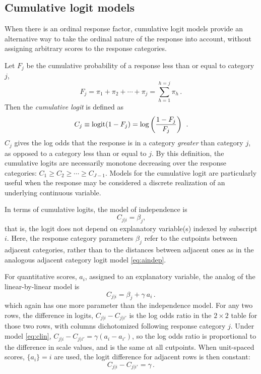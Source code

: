 

\subsection{Cumulative logit models}\label{sec:loglin-ordcum}
When there is an ordinal response factor, cumulative logit models
\citep{WilliamsGrizzle:72} provide
an alternative way to take the ordinal nature of the response into account,
without assigning arbitrary scores to the response categories.

Let $F_j$ be the cumulative probability of a response less than or equal
to category $j$,
\begin{equation*}
F_j = \pi_1 + \pi_2 + \cdots + \pi_j  = \sum_{h=1}^{h=j} \pi_h
 \period
\end{equation*}
Then the \emph{cumulative logit} is defined as
\begin{equation*}%
C_j \equiv \logit ( 1 - F_j ) =
  \log \left( \frac { 1 - F_j }{F_j} \right) \period
\end{equation*}
$C_j$ gives the log odds that the response is in a category \emph{greater} than
category $j$, as opposed to a category less than or equal to $j$.
By this definition, the cumulative logits are necessarily
monotone decreasing over the response categories:
$C_1 \ge C_2 \ge \cdots \ge C_{J-1}$.
Models for the cumulative logit are particularly useful when the
response may be considered a discrete realization of an underlying
continuous variable.

In terms of cumulative logits, the model of independence is
\begin{equation*}%
C_{j|i} = \beta_j \comma
\end{equation*}
that is, the logit does not depend on explanatory variable(s) indexed
by subscript $i$.
Here, the response category parameters $\beta_j$ refer to the
cutpoints between adjacent categories, rather than to the distances
between adjacent ones as in the analogous adjacent category logit
model \eqref{eq:aindep}.

For quantitative scores, $a_i$, assigned to an explanatory variable,
the analog of the linear-by-linear model is
\begin{equation}\label{eq:clin}
 C_{j| i} = \beta_j + \gamma \: a_i
 \period
\end{equation}
which again has one more parameter than the independence model.
For any two rows, the difference in logits,
$C_{j| i} - C_{j| i'}$
is the log odds ratio in the $2\times 2$ table
for those two rows, with columns dichotomized following response category $j$.
Under model \eqref{eq:clin}, $C_{j| i} - C_{j| i'} = \gamma ( a_i - a_{i'})$,
so the log odds ratio is proportional to the difference in scale values,
and is the same at all cutpoints.
When unit-spaced scores, $\{a_i\} = i$ are used, the logit difference for
adjacent rows is then constant:
\begin{equation*}
 C_{j| i} - C_{j| i'} = \gamma
 \period
\end{equation*}


